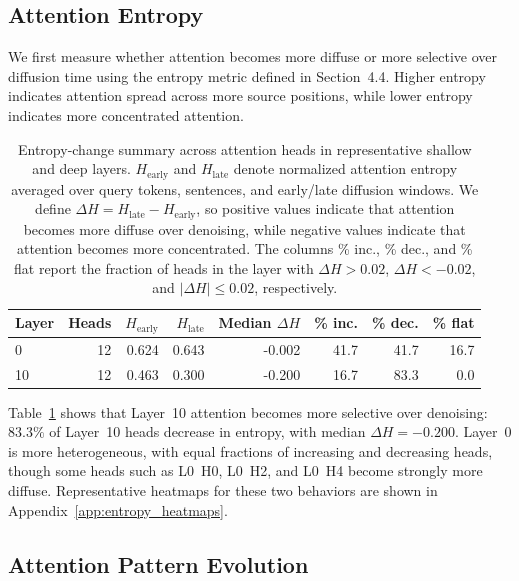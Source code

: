 \documentclass{article} %
\begin{document}
\subsection{Attention Entropy}

We first measure whether attention becomes more diffuse or more selective over diffusion time using the entropy metric defined in Section~4.4. Higher entropy indicates attention spread across more source positions, while lower entropy indicates more concentrated attention.

\begin{table}[H]
\centering
\small
\begin{tabular}{lrrrrrrr}
\toprule
Layer & Heads & $H_{\mathrm{early}}$ & $H_{\mathrm{late}}$ & Median $\Delta H$ & \% inc. & \% dec. & \% flat \\
\midrule
0  & 12 & 0.624 & 0.643 & -0.002 & 41.7 & 41.7 & 16.7 \\
10 & 12 & 0.463 & 0.300 & -0.200 & 16.7 & 83.3 & 0.0 \\
\bottomrule
\end{tabular}
\caption{Entropy-change summary across attention heads in representative shallow and deep layers. $H_{\mathrm{early}}$ and $H_{\mathrm{late}}$ denote normalized attention entropy averaged over query tokens, sentences, and early/late diffusion windows. We define $\Delta H = H_{\mathrm{late}} - H_{\mathrm{early}}$, so positive values indicate that attention becomes more diffuse over denoising, while negative values indicate that attention becomes more concentrated. The columns \% inc., \% dec., and \% flat report the fraction of heads in the layer with $\Delta H > 0.02$, $\Delta H < -0.02$, and $|\Delta H| \leq 0.02$, respectively.}
\label{tab:entropy_summary}
\end{table}

Table~\ref{tab:entropy_summary} shows that Layer~10 attention becomes more selective over denoising: $83.3\%$ of Layer~10 heads decrease in entropy, with median $\Delta H=-0.200$. Layer~0 is more heterogeneous, with equal fractions of increasing and decreasing heads, though some heads such as L0~H0, L0~H2, and L0~H4 become strongly more diffuse. Representative heatmaps for these two behaviors are shown in Appendix~\ref{app:entropy_heatmaps}.

\subsection{Attention Pattern Evolution}\label{subsec:attn_patterns}
\end{document}
